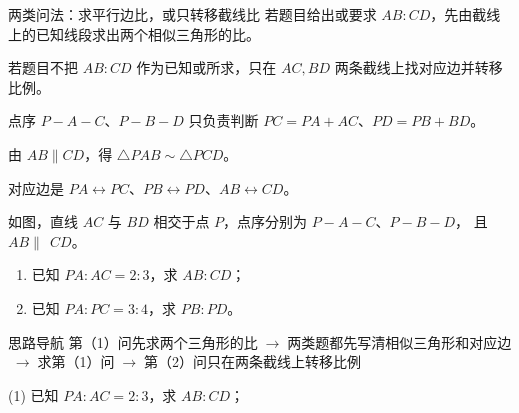 \documentclass{exam-zh}
\begin{document}


\begin{eduSolutionBox}{两类问法：求平行边比，或只转移截线比}
  \begingroup
  \setlength{\parskip}{2.5mm}
若题目给出或要求 $AB:CD$，先由截线上的已知线段求出两个相似三角形的比。\par
若题目不把 $AB:CD$ 作为已知或所求，只在 $AC,BD$ 两条截线上找对应边并转移比例。\par
点序 $P-A-C$、$P-B-D$ 只负责判断 $PC=PA+AC$、$PD=PB+BD$。\par
由 $AB\parallel CD$，得 $\triangle PAB\sim\triangle PCD$。\par
对应边是 $PA\leftrightarrow PC$、$PB\leftrightarrow PD$、$AB\leftrightarrow CD$。\par
  \endgroup
\end{eduSolutionBox}




\begin{eduProblemBlock}[A 字型例题]
\noindent
\begin{minipage}[t]{\dimexpr\linewidth-70mm-6mm\relax}
\vspace{0pt}
如图，直线 $AC$ 与 $BD$ 相交于点 $P$，点序分别为 $P-A-C$、$P-B-D$，
且 $AB\parallel\ \ CD$。
\begin{enumerate}[label=(\arabic*)]
  \item 已知 $PA:AC=2:3$，求 $AB:CD$；
\ \  \item 已知 $PA:PC=3:4$，求 $PB:PD$。
\end{enumerate}

\end{minipage}\hfill
\begin{diagramcoltikz}{70mm}{看清 $P,A,C$ 和 $P,B,D$ 的先后顺序。}
}
\end{diagramcoltikz}
\end{eduProblemBlock}





\begin{eduAuxItem}{思路导航}
第（1）问先求两个三角形的比$\;\to\;$两类题都先写清相似三角形和对应边$\;\to\;$求第（1）问$\;\to\;$第（2）问只在两条截线上转移比例\end{eduAuxItem}




\begin{eduSubQuestionItem}{(1)}
已知 $PA:AC=2:3$，求 $AB:CD$；\end{eduSubQuestionItem}
\end{document}
